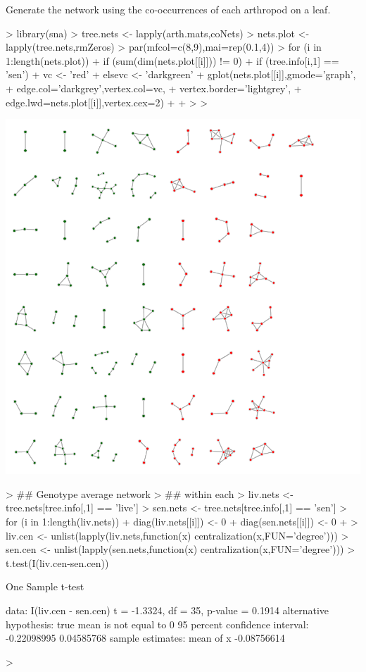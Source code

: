 \documentclass[12pt]{article}
\begin{document}
Generate the network using the co-occurrences of each arthropod on a leaf.

\begin{Schunk}
\begin{Sinput}
> library(sna)
> tree.nets <- lapply(arth.mats,coNets)
> nets.plot <- lapply(tree.nets,rmZeros)
> par(mfcol=c(8,9),mai=rep(0.1,4))
> for (i in 1:length(nets.plot)){
+     if (sum(dim(nets.plot[[i]])) != 0){
+         if (tree.info[i,1] == 'sen'){
+             vc <- 'red'
+         }else{vc <- 'darkgreen'}
+         gplot(nets.plot[[i]],gmode='graph',
+               edge.col='darkgrey',vertex.col=vc,
+               vertex.border='lightgrey',
+               edge.lwd=nets.plot[[i]],vertex.cex=2)
+     }
+ }
> 
> 
\end{Sinput}
\end{Schunk}
\includegraphics{notebook-002}

\begin{Schunk}
\begin{Sinput}
> ## Genotype average network 
> ## within each 
> liv.nets <- tree.nets[tree.info[,1] == 'live']
> sen.nets <- tree.nets[tree.info[,1] == 'sen']
> for (i in 1:length(liv.nets)){
+     diag(liv.nets[[i]]) <- 0
+     diag(sen.nets[[i]]) <- 0
+ }
> liv.cen <- unlist(lapply(liv.nets,function(x) centralization(x,FUN='degree')))
> sen.cen <- unlist(lapply(sen.nets,function(x) centralization(x,FUN='degree')))
> t.test(I(liv.cen-sen.cen))
\end{Sinput}
\begin{Soutput}
	One Sample t-test

data:  I(liv.cen - sen.cen)
t = -1.3324, df = 35, p-value = 0.1914
alternative hypothesis: true mean is not equal to 0
95 percent confidence interval:
 -0.22098995  0.04585768
sample estimates:
  mean of x 
-0.08756614 
\end{Soutput}
\begin{Sinput}
> 
\end{Sinput}
\end{Schunk}
\end{document}

